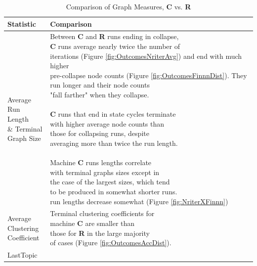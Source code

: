 \documentclass{tufte-handout}
\begin{document}
\begin{table}
\centering
\caption{Comparison of Graph Measures, \textbf{C} vs. \textbf{R}}
\begin{tabular}{ll}\toprule
\addlinespace[3mm]
Statistic  & Comparison \\ \midrule
\addlinespace[2mm]

\makecell[tl]{
Average \\%
Run Length \\%
\& Terminal \\%
Graph Size} &
\makecell[tl]{
Between \textbf{C} and \textbf{R} runs ending in collapse, \\%
\textbf{C} runs average nearly twice the number of \\%
iterations (Figure \ref{fig:OutcomesNriterAvg}) and end with much higher \\%
pre-collapse node counts (Figure \ref{fig:OutcomesFinnnDist}). They \\%
run longer and their node counts \\%
"fall farther" when they collapse. \\%
\\%
\textbf{C} runs that end in state cycles terminate \\%
with higher average node counts than \\%
those for collapsing runs, despite \\%
averaging more than twice the run length. \\%
\\%
Machine \textbf{C} runs lengths correlate \\%
with terminal graphs sizes except in \\%
the case of the largest sizes, which tend \\%
to be produced in somewhat shorter runs. \\%
run lengths decrease somewhat (Figure \ref{fig:NriterXFinnn})} \\

\vspace{2mm}
\makecell[tl]{
Average \\%
Clustering \\%
Coefficient} &
\makecell[tl]{
Terminal clustering coefficients for \\%
machine \textbf{C} are smaller than \\%
those for \textbf{R} in the large majority \\%
of cases (Figure \ref{fig:OutcomesAccDist}).} \\

\vspace{2mm}
LastTopic & \\ \bottomrule
\end{tabular}
\label{tab:TabQ}
\end{table}
\end{document}
